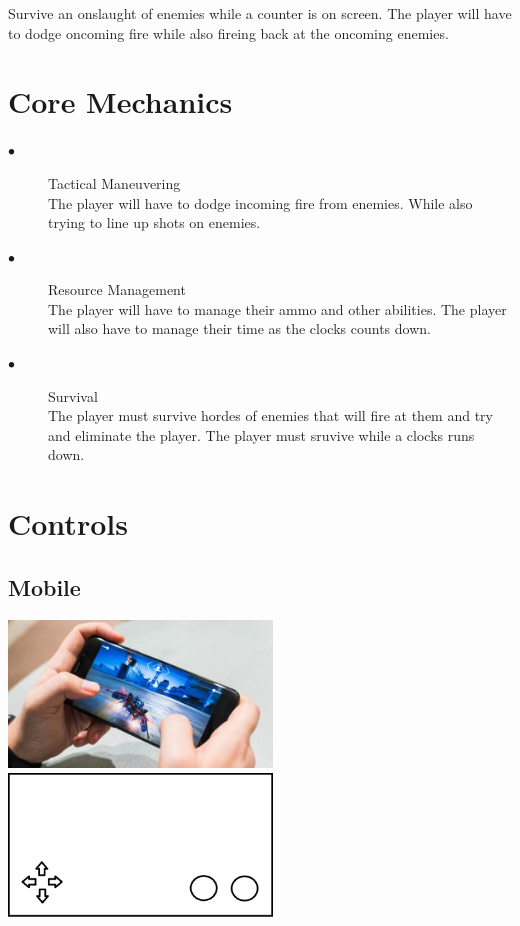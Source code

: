 \documentclass[a4paper]{scrreprt}
\begin{document}
Survive an onslaught of enemies while a counter is on screen. 
The player will have to dodge oncoming fire while also fireing back at the oncoming enemies.

\section{Core Mechanics}

\begin{description}
\item[$\bullet$] Tactical Maneuvering \\
The player will have to dodge incoming fire from enemies. While also trying to line up shots on enemies.
\item[$\bullet$] Resource Management \\
The player will have to manage their ammo and other abilities. The player will also have to manage their time as the clocks counts down.
\item[$\bullet$] Survival \\
The player must survive hordes of enemies that will fire at them and try and eliminate the player. The player must sruvive while a clocks runs down.
\end{description}

\section{Controls}

\subsection{Mobile}

\begin{center}
\includegraphics[width=7cm]{mobile}
\includegraphics[width=7cm]{mobile-controls}
\end{center}
\end{document}
